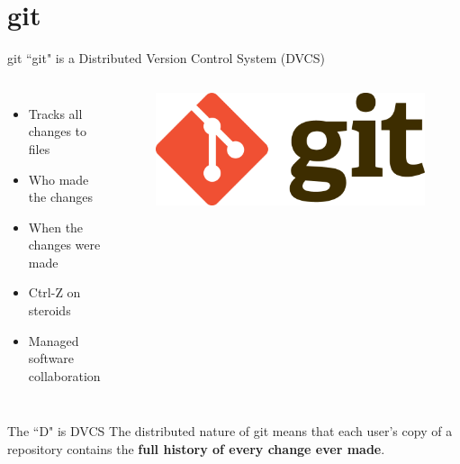 \documentclass{beamer}
\begin{document}
    \section{git}\label{sec:what-is-git?}
    \begin{frame}{git}
        ``git" is a Distributed Version Control System (DVCS)
        \begin{columns}
            \begin{itemize}
                \item Tracks all changes to files
                \item Who made the changes
                \item When the changes were made
                \item Ctrl-Z on steroids
                \item Managed software collaboration
            \end{itemize}

            \begin{figure}
                \centering
                \includegraphics[width=\textwidth]{figures/Git-Logo-2Color.png}
            \end{figure}

        \end{columns}
        \begin{alertblock}{The ``D" is DVCS}
            The distributed nature of git means that each user's copy of a repository contains the \textbf{full history of every change ever made}.
        \end{alertblock}
    \end{frame}
\end{document}
